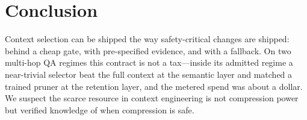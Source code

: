 \documentclass[11pt]{article}
\begin{document}
\section{Conclusion}

Context selection can be shipped the way safety-critical changes are
shipped: behind a cheap gate, with pre-specified evidence, and with a
fallback. On two multi-hop QA regimes this contract is not a tax---inside
its admitted regime a near-trivial selector beat the full context
at the semantic layer and matched a trained pruner at the retention layer,
and the metered spend was about a dollar. We suspect the scarce resource
in context engineering is not compression power but verified knowledge of
when compression is safe.



\end{document}
